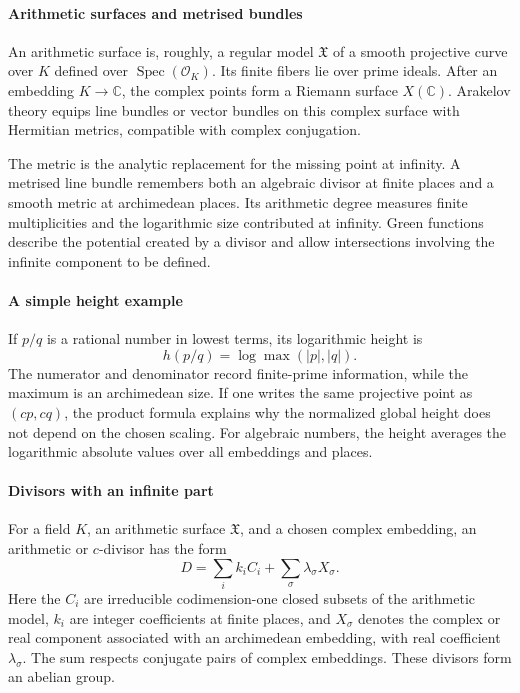 \paragraph{Arithmetic surfaces and metrised bundles}

An arithmetic surface is, roughly, a regular model $\mathfrak X$ of a smooth projective curve over $K$ defined over $\operatorname{Spec}(\mathcal O_K)$. Its finite fibers lie over prime ideals. After an embedding $K\to\mathbb C$, the complex points form a Riemann surface $X(\mathbb C)$. Arakelov theory equips line bundles or vector bundles on this complex surface with Hermitian metrics, compatible with complex conjugation.

The metric is the analytic replacement for the missing point at infinity. A metrised line bundle remembers both an algebraic divisor at finite places and a smooth metric at archimedean places. Its arithmetic degree measures finite multiplicities and the logarithmic size contributed at infinity. Green functions describe the potential created by a divisor and allow intersections involving the infinite component to be defined.

\paragraph{A simple height example}

If $p/q$ is a rational number in lowest terms, its logarithmic height is
\[
 h(p/q)=\log\max(|p|,|q|).
\]
The numerator and denominator record finite-prime information, while the maximum is an archimedean size. If one writes the same projective point as $(cp,cq)$, the product formula explains why the normalized global height does not depend on the chosen scaling. For algebraic numbers, the height averages the logarithmic absolute values over all embeddings and places.

\paragraph{Divisors with an infinite part}

For a field $K$, an arithmetic surface $\mathfrak X$, and a chosen complex embedding, an arithmetic or $c$-divisor has the form
\[
 D=\sum_i k_i C_i+\sum_{\sigma}\lambda_\sigma X_\sigma.
\]
Here the $C_i$ are irreducible codimension-one closed subsets of the arithmetic model, $k_i$ are integer coefficients at finite places, and $X_\sigma$ denotes the complex or real component associated with an archimedean embedding, with real coefficient $\lambda_\sigma$. The sum respects conjugate pairs of complex embeddings. These divisors form an abelian group.

